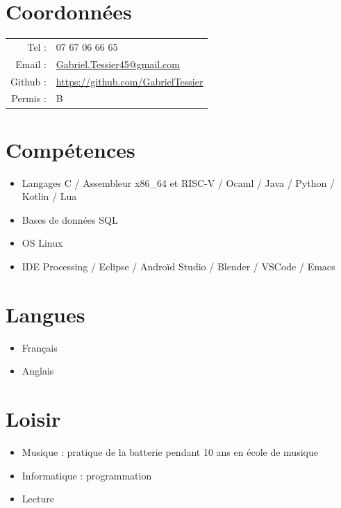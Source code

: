 \documentclass[11pt,oneside,a4paper,titlepage]{article}
\begin{document}
\begin{tcolorbox}
  \begin{minipage}[t]{8cm}
    \vspace*{-0.5cm}
    \begin{tcolorbox}[grow to left by=0.6cm,colback=gray!25,colframe=white]
      \section*{Coordonnées}
      \setlength{\tabcolsep}{2pt}
      \begin{tabular}{rl}
        Tel : & 07 67 06 66 65 \\
        Email : & \href{mailto:Gabriel.Tessier45@gmail.com}{Gabriel.Tessier45@gmail.com} \\
        Github : & \href{https://github.com/GabrielTessier}{https://github.com/GabrielTessier} \\
        Permis : & B
      \end{tabular}

      \section*{Compétences}
      \begin{itemize}
        \item{Langages C / Assembleur x86\_64 et RISC-V / Ocaml / Java / Python / Kotlin / Lua}
        \item{Bases de données SQL}
        \item{OS Linux}
        \item{IDE Processing / Eclipse / Androïd Studio / Blender / VSCode / Emacs}
      \end{itemize}

      \section*{Langues}
      \begin{itemize}
        \item{Français}
        \item{Anglais}
      \end{itemize}

      \section*{Loisir}
      \begin{itemize}
        \item{Musique : pratique de la batterie pendant 10 ans en école de musique}
        \item{Informatique : programmation}
        \item{Lecture}
      \end{itemize}
    \end{tcolorbox}
  \end{minipage}
  \begin{minipage}[t]{10.6cm}
    \vspace*{-0.5cm}
    \begin{tcolorbox}[grow to right by=0.75cm,colframe=white,colback=white]

\end{tcolorbox}
\end{minipage}
\end{tcolorbox}
\end{document}
